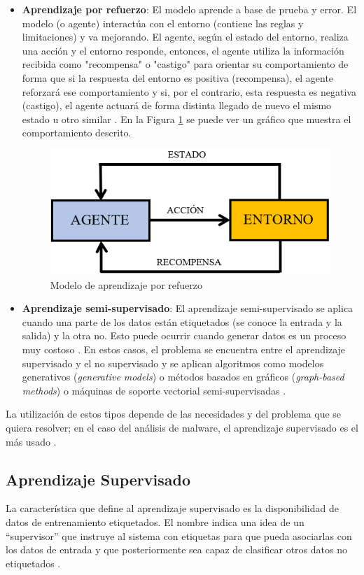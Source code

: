 \begin{itemize}
    \item \textbf{Aprendizaje por refuerzo}: El modelo aprende a base de prueba y error. El modelo (o agente) interactúa con el entorno (contiene las reglas y limitaciones) y va mejorando. El agente, según el estado del entorno, realiza una acción y el entorno responde, entonces, el agente utiliza la información recibida como "recompensa" o "castigo" para orientar su comportamiento de forma que si la respuesta del entorno es positiva (recompensa), el agente reforzará ese comportamiento y si, por el contrario, esta respuesta es negativa (castigo), el agente actuará de forma distinta llegado de nuevo el mismo estado u otro similar \cite{MML2018} \cite{Thomas_2020}. En la Figura \ref{fig:areforzado} se puede ver un gráfico que muestra el comportamiento descrito.
    
    \begin{figure}[htb]
    \begin{center}
    \includegraphics[width=0.45\linewidth]{images/areforzado.PNG}
    \end{center}
    \caption{Modelo de aprendizaje por refuerzo}
    \label{fig:areforzado}
    \end{figure}

     \item \textbf{Aprendizaje semi-supervisado}: El aprendizaje semi-supervisado se aplica cuando una parte de los datos están etiquetados (se conoce la entrada y la salida) y la otra no. Esto puede ocurrir cuando generar datos es un proceso muy costoso \cite{MML2018}. En estos casos, el problema se encuentra entre el aprendizaje supervisado y el no supervisado y se aplican algoritmos como modelos generativos (\textit{generative models}) o métodos basados en gráficos (\textit{graph-based methods}) o máquinas de soporte vectorial semi-supervisadas \cite{Thomas_2020}.
    
\end{itemize}

La utilización de estos tipos depende de las necesidades y del problema que se quiera resolver; en el caso del análisis de malware, el aprendizaje supervisado es el más usado \cite{zero}.

\subsection{Aprendizaje Supervisado}\label{sec:algoritmos}
\noindent La característica que define al aprendizaje supervisado es la disponibilidad de datos de entrenamiento etiquetados. El nombre indica una idea de un ``supervisor'' que instruye al sistema con etiquetas para que pueda asociarlas con los datos de entrada y que posteriormente sea capaz de clasificar otros datos no etiquetados \cite{126}.

